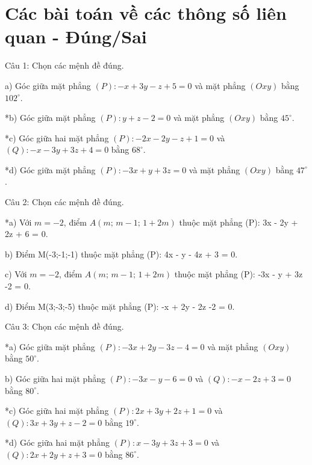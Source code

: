 \documentclass[a4paper,12pt]{article}
\begin{document}
\section*{Các bài toán về các thông số liên quan - Đúng/Sai}

Câu 1: Chọn các mệnh đề đúng.

a) Góc giữa mặt phẳng $(P): -x + 3y - z + 5 = 0$ và mặt phẳng $(Oxy)$ bằng $ 102^\circ $.

*b) Góc giữa mặt phẳng $(P): y + z -2 = 0$ và mặt phẳng $(Oxy)$ bằng $ 45^\circ $.

*c) Góc giữa hai mặt phẳng $(P): -2x - 2y - z + 1 = 0$ và $(Q): -x - 3y + 3z + 4 = 0$ bằng $ 68^\circ $.

*d) Góc giữa mặt phẳng $(P): -3x + y + 3z = 0$ và mặt phẳng $(Oxy)$ bằng $ 47^\circ $.



Câu 2: Chọn các mệnh đề đúng.

*a) Với $m = -2$, điểm $A(m;\, m-1;\, 1+2m)$ thuộc mặt phẳng (P): 3x - 2y + 2z + 6 = 0.

b) Điểm M(-3;-1;-1) thuộc mặt phẳng (P): 4x - y - 4z + 3 = 0.

c) Với $m = -2$, điểm $A(m;\, m-1;\, 1+2m)$ thuộc mặt phẳng (P): -3x - y + 3z -2 = 0.

d) Điểm M(3;-3;-5) thuộc mặt phẳng (P): -x + 2y - 2z -2 = 0.



Câu 3: Chọn các mệnh đề đúng.

*a) Góc giữa mặt phẳng $(P): -3x + 2y - 3z -4 = 0$ và mặt phẳng $(Oxy)$ bằng $ 50^\circ $.

b) Góc giữa hai mặt phẳng $(P): -3x - y -6 = 0$ và $(Q): -x - 2z + 3 = 0$ bằng $ 80^\circ $.

*c) Góc giữa hai mặt phẳng $(P): 2x + 3y + 2z + 1 = 0$ và $(Q): 3x + 3y + z -2 = 0$ bằng $ 19^\circ $.

*d) Góc giữa hai mặt phẳng $(P): x - 3y + 3z + 3 = 0$ và $(Q): 2x + 2y + z + 3 = 0$ bằng $ 86^\circ $.
\end{document}
